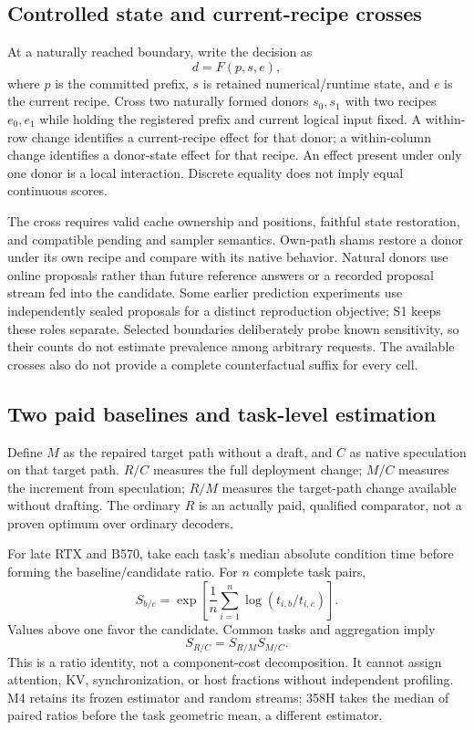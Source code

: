 \subsection{Controlled state and current-recipe crosses}
At a naturally reached boundary, write the decision as
\begin{equation}
d=F(p,s,e),
\label{eq:decision}
\end{equation}
where $p$ is the committed prefix, $s$ is retained numerical/runtime state, and $e$ is the current recipe. Cross two naturally formed donors $s_0,s_1$ with two recipes $e_0,e_1$ while holding the registered prefix and current logical input fixed. A within-row change identifies a current-recipe effect for that donor; a within-column change identifies a donor-state effect for that recipe. An effect present under only one donor is a local interaction. Discrete equality does not imply equal continuous scores.

The cross requires valid cache ownership and positions, faithful state restoration, and compatible pending and sampler semantics. Own-path shams restore a donor under its own recipe and compare with its native behavior. Natural donors use online proposals rather than future reference answers or a recorded proposal stream fed into the candidate. Some earlier prediction experiments use independently sealed proposals for a distinct reproduction objective; S1 keeps these roles separate. Selected boundaries deliberately probe known sensitivity, so their counts do not estimate prevalence among arbitrary requests. The available crosses also do not provide a complete counterfactual suffix for every cell.

\subsection{Two paid baselines and task-level estimation}
Define $M$ as the repaired target path without a draft, and $C$ as native speculation on that target path. $R/C$ measures the full deployment change; $M/C$ measures the increment from speculation; $R/M$ measures the target-path change available without drafting. The ordinary $R$ is an actually paid, qualified comparator, not a proven optimum over ordinary decoders.

For late RTX and B570, take each task's median absolute condition time before forming the baseline/candidate ratio. For $n$ complete task pairs,
\begin{equation}
S_{b/c}=\exp\left[\frac{1}{n}\sum_{i=1}^{n}\log\left(t_{i,b}/t_{i,c}\right)\right].
\label{eq:gm}
\end{equation}
Values above one favor the candidate. Common tasks and aggregation imply
\begin{equation}
S_{R/C}=S_{R/M}S_{M/C}.
\label{eq:identity}
\end{equation}
This is a ratio identity, not a component-cost decomposition. It cannot assign attention, KV, synchronization, or host fractions without independent profiling. M4 retains its frozen estimator and random streams; 358H takes the median of paired ratios before the task geometric mean, a different estimator.

